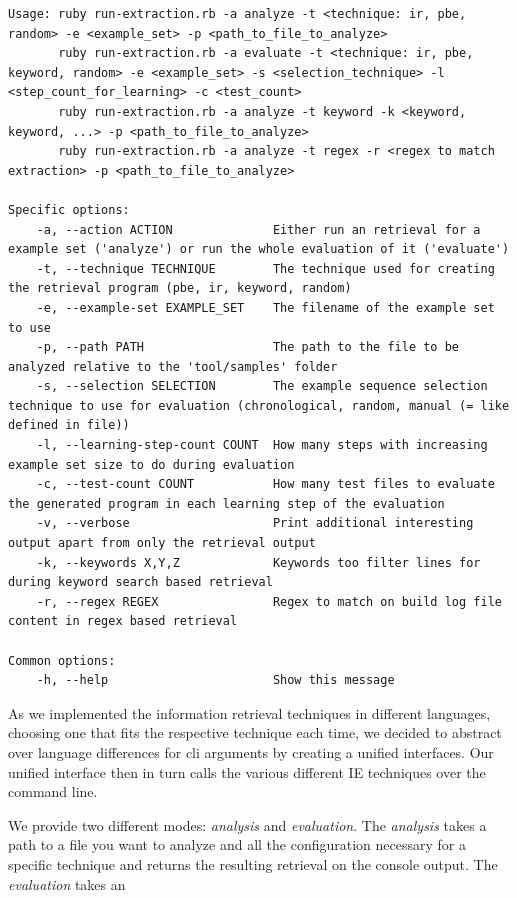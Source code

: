 \documentclass[\myrootdir/main.tex]{subfiles}
\begin{document}
\begin{lstlisting}
Usage: ruby run-extraction.rb -a analyze -t <technique: ir, pbe, random> -e <example_set> -p <path_to_file_to_analyze>
       ruby run-extraction.rb -a evaluate -t <technique: ir, pbe, keyword, random> -e <example_set> -s <selection_technique> -l <step_count_for_learning> -c <test_count>
       ruby run-extraction.rb -a analyze -t keyword -k <keyword, keyword, ...> -p <path_to_file_to_analyze>
       ruby run-extraction.rb -a analyze -t regex -r <regex to match extraction> -p <path_to_file_to_analyze>

Specific options:
    -a, --action ACTION              Either run an retrieval for a example set ('analyze') or run the whole evaluation of it ('evaluate')
    -t, --technique TECHNIQUE        The technique used for creating the retrieval program (pbe, ir, keyword, random)
    -e, --example-set EXAMPLE_SET    The filename of the example set to use
    -p, --path PATH                  The path to the file to be analyzed relative to the 'tool/samples' folder
    -s, --selection SELECTION        The example sequence selection technique to use for evaluation (chronological, random, manual (= like defined in file))
    -l, --learning-step-count COUNT  How many steps with increasing example set size to do during evaluation
    -c, --test-count COUNT           How many test files to evaluate the generated program in each learning step of the evaluation
    -v, --verbose                    Print additional interesting output apart from only the retrieval output
    -k, --keywords X,Y,Z             Keywords too filter lines for during keyword search based retrieval
    -r, --regex REGEX                Regex to match on build log file content in regex based retrieval

Common options:
    -h, --help                       Show this message
\end{lstlisting}
As we implemented the information retrieval techniques in different languages, choosing one that fits the respective technique each time, we decided to abstract over language differences for cli arguments by creating a unified interfaces. Our unified interface then in turn calls the various different IE techniques over the command line.

We provide two different modes: \emph{analysis} and \emph{evaluation}.
The \emph{analysis} takes a path to a file you want to analyze and all the configuration necessary for a specific technique and returns the resulting retrieval on the console output. The \emph{evaluation} takes an 
\end{document}
